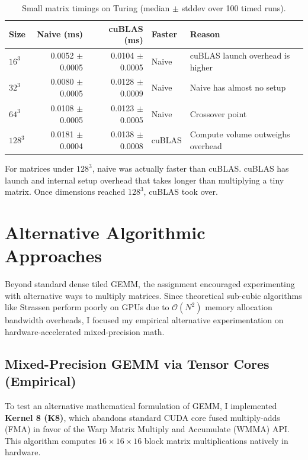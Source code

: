 \documentclass[11pt]{article}
\begin{document}
\begin{table}[h]
\centering
\begin{tabular}{|l|r|r|l|l|}
\hline
\textbf{Size} & \textbf{Naive (ms)} & \textbf{cuBLAS (ms)} & \textbf{Faster} & \textbf{Reason} \\
\hline
$16^3$ & 0.0052 $\pm$ 0.0005 & 0.0104 $\pm$ 0.0005 & Naive & cuBLAS launch overhead is higher \\
$32^3$ & 0.0080 $\pm$ 0.0005 & 0.0128 $\pm$ 0.0009 & Naive & Naive has almost no setup \\
$64^3$ & 0.0108 $\pm$ 0.0005 & 0.0123 $\pm$ 0.0005 & Naive & Crossover point \\
$128^3$ & 0.0181 $\pm$ 0.0004 & 0.0138 $\pm$ 0.0008 & cuBLAS & Compute volume outweighs overhead \\
\hline
\end{tabular}
\caption{Small matrix timings on Turing (median $\pm$ stddev over 100 timed runs).}
\end{table}

For matrices under $128^3$, naive was actually faster than cuBLAS. cuBLAS has launch and internal setup overhead that takes longer than multiplying a tiny matrix. Once dimensions reached $128^3$, cuBLAS took over.

\section{Alternative Algorithmic Approaches}

Beyond standard dense tiled GEMM, the assignment encouraged experimenting with alternative ways to multiply matrices. Since theoretical sub-cubic algorithms like Strassen perform poorly on GPUs due to $\mathcal{O}(N^2)$ memory allocation bandwidth overheads, I focused my empirical alternative experimentation on hardware-accelerated mixed-precision math.

\subsection{Mixed-Precision GEMM via Tensor Cores (Empirical)}
To test an alternative mathematical formulation of GEMM, I implemented \textbf{Kernel 8 (K8)}, which abandons standard CUDA core fused multiply-adds (FMA) in favor of the Warp Matrix Multiply and Accumulate (WMMA) API. This algorithm computes $16 \times 16 \times 16$ block matrix multiplications natively in hardware.
\end{document}
